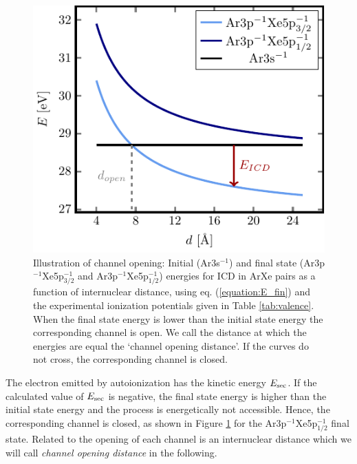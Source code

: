 \begin{figure}[h]
 \centering
 \includegraphics[width=\columnwidth]{pics/channel_open_ICD.pdf}
 \caption{Illustration of channel opening: Initial (Ar3s$^{-1}$)
          and final state (Ar3p$^{-1}$Xe5p$_{3/2}^{-1}$ and
          Ar3p$^{-1}$Xe5p$_{1/2}^{-1}$) energies
          for ICD in ArXe pairs as a function of 
          internuclear distance, using eq. (\ref{equation:E_fin})
          and the experimental ionization
          potentials given
          in Table \ref{tab:valence}. When the final state energy is lower
          than the initial state energy the corresponding channel
          is open. We call the distance at which the energies are equal
          the `channel opening distance'. If the curves do not cross, the
          corresponding channel is closed.}
 \label{figure:channel_open_ICD}
\end{figure}

The electron emitted by autoionization has the kinetic energy $E_{\rm sec}$. 
If the calculated value of $E_{\rm sec}$ is negative,
the final state energy is higher than the initial state energy and the        
process is energetically not accessible. Hence, the corresponding channel     
is closed, as shown in Figure \ref{figure:channel_open_ICD} for the
Ar3p$^{-1}$Xe5p$_{1/2}^{-1}$ final state. Related to
the opening of each channel is an internuclear distance which we will call 
\emph{channel opening distance} in the following.
                                                               
